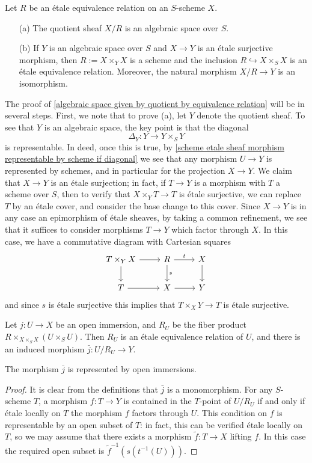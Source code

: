 \begin{proposition}\label{algebraic space given by quotient by equivalence relation}
Let $R$ be an \'etale equivalence relation on an $S$-scheme $X$.
\begin{enumerate}
    \item[(a)] The quotient sheaf $X/R$ is an algebraic space over $S$.
    \item[(b)] If $Y$ is an algebraic space over $S$ and $X\to Y$ is an \'etale surjective morphism, then $R:=X\times_YX$ is a scheme and the inclusion $R\hookrightarrow X\times_SX$ is an \'etale equivalence relation. Moreover, the natural morphism $X/R\to Y$ is an isomorphism.
\end{enumerate}
\end{proposition} 

The proof of \cref{algebraic space given by quotient by equivalence relation} will be in several steps. First, we note that to prove (a), let $Y$ denote the quotient sheaf. To see that $Y$ is an algebraic space, the key point is that the diagonal
\[\Delta_Y:Y\to Y\times_SY\]
is representable. In deed, once this is true, by \cref{scheme etale sheaf morphism representable by scheme if diagonal} we see that any morphism $U\to Y$ is represented by schemes, and in particular for the projection $X\to Y$. We claim that $X\to Y$ is an \'etale surjection; in fact, if $T\to Y$ is a morphism with $T$ a scheme over $S$, then to verify that $X\times_YT\to T$ is \'etale surjective, we can replace $T$ by an \'etale cover, and consider the base change to this cover. Since $X\to Y$ is in any case an epimorphism of \'etale sheaves, by taking a common refinement, we see that it suffices to consider morphisms $T\to Y$ which factor through $X$. In this case, we have a commutative diagram with Cartesian squares
\[\begin{tikzcd}
T\times_YX\ar[r]\ar[d]&R\ar[d,"s"]\ar[r,"t"]&X\ar[d]\\
T\ar[r]&X\ar[r]&Y
\end{tikzcd}\]
and since $s$ is \'etale surjective this implies that $T\times_XY\to T$ is \'etale surjective.\par
Let $j:U\to X$ be an open immersion, and $R_U$ be the fiber product $R\times_{X\times_SX}(U\times_SU)$. Then $R_U$ is an \'etale equivalence relation of $U$, and there is an induced morphism $\bar{j}:U/R_U\to Y$.

\begin{lemma}\label{scheme etale sheaf quotient by equivalence relation open subscheme prop}
The morphism $\bar{j}$ is represented by open immersions.
\end{lemma}
\begin{proof}
It is clear from the definitions that $\bar{j}$ is a monomorphism. For any $S$-scheme $T$, a morphism $f:T\to Y$ is contained in the $T$-point of $U/R_U$ if and only if \'etale locally on $T$ the morphism $f$ factors through $U$. This condition on $f$ is representable by an open subset of $T$: in fact, this can be verified \'etale locally on $T$, so we may assume that there exists a morphism $\tilde{f}:T\to X$ lifting $f$. In this case the required open subset is $\tilde{f}^{-1}(s(t^{-1}(U)))$.
\end{proof}

